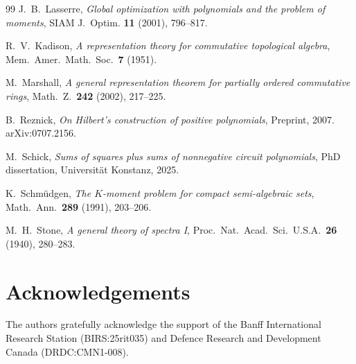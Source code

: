 \documentclass{amsart}
\theoremstyle{definition}
\numberwithin{equation}{section}
\begin{document}
\begin{thebibliography}{99}
J.~B.~Lasserre,
\emph{Global optimization with polynomials and the problem of moments},
SIAM J.~Optim. \textbf{11} (2001), 796--817.

R.~V.~Kadison,
\emph{A representation theory for commutative topological algebra},
Mem.~Amer.~Math.~Soc.~\textbf{7} (1951).

M.~Marshall,
\emph{A general representation theorem for partially ordered commutative rings},
Math.~Z.~\textbf{242} (2002), 217--225.

B.~Reznick,
\emph{On Hilbert's construction of positive polynomials},
Preprint, 2007.  arXiv:0707.2156.

M.~Schick,
\emph{Sums of squares plus sums of nonnegative circuit polynomials},
PhD dissertation, Universit\"at Konstanz, 2025.

K.~Schm\"udgen,
\emph{The $K$-moment problem for compact semi-algebraic sets},
Math.~Ann.~\textbf{289} (1991), 203--206.

M.~H.~Stone,
\emph{A general theory of spectra I},
Proc.~Nat.~Acad.~Sci.~U.S.A.~\textbf{26} (1940), 280--283.

\end{thebibliography}

\section*{Acknowledgements}
The authors gratefully acknowledge the support of the Banff International
Research Station (BIRS:25rit035) and Defence Research and Development Canada (DRDC:CMN1-008).
\end{document}
